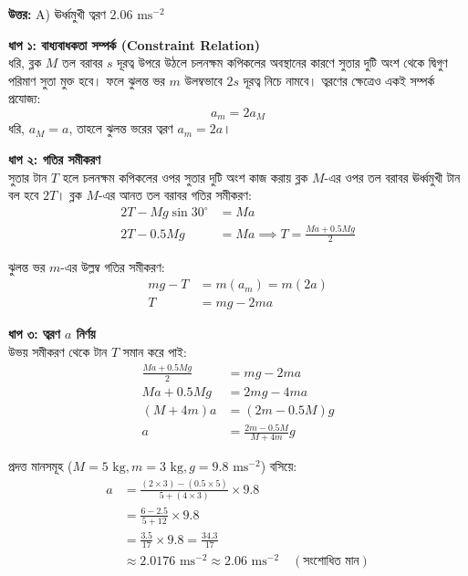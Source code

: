\documentclass[12pt, a4paper]{article}
\begin{document}
\vspace{0.5em}
\begin{tcolorbox}[answerbox]
    \textbf{\color{success} উত্তর:} A) ঊর্ধ্বমুখী ত্বরণ $2.06\text{ ms}^{-2}$
\end{tcolorbox}
\vspace{1em}

\begin{tcolorbox}[solutionbox={সমাধান (Solution)}]
    \noindent
    \textbf{ধাপ ১: বাধ্যবাধকতা সম্পর্ক (Constraint Relation)} \\
    ধরি, ব্লক $M$ তল বরাবর $s$ দূরত্ব উপরে উঠলে চলনক্ষম কপিকলের অবস্থানের কারণে সুতার দুটি অংশ থেকে দ্বিগুণ পরিমাণ সুতা মুক্ত হবে। ফলে ঝুলন্ত ভর $m$ উলম্বভাবে $2s$ দূরত্ব নিচে নামবে। 
    ত্বরণের ক্ষেত্রেও একই সম্পর্ক প্রযোজ্য:
    \[ a_m = 2 a_M \]
    ধরি, $a_M = a$, তাহলে ঝুলন্ত ভরের ত্বরণ $a_m = 2a$।
    
    \vspace{0.5em}
    \noindent\textbf{ধাপ ২: গতির সমীকরণ} \\
    সুতার টান $T$ হলে চলনক্ষম কপিকলের ওপর সুতার দুটি অংশ কাজ করায় ব্লক $M$-এর ওপর তল বরাবর ঊর্ধ্বমুখী টান বল হবে $2T$।
    ব্লক $M$-এর আনত তল বরাবর গতির সমীকরণ:
    \begin{align*}
        2T - M g \sin 30^\circ &= M a \\
        2T - 0.5 M g &= M a \implies T = \frac{M a + 0.5 M g}{2}
    \end{align*}
    
    ঝুলন্ত ভর $m$-এর উল্লম্ব গতির সমীকরণ:
    \begin{align*}
        m g - T &= m (a_m) = m (2a) \\
        T &= m g - 2 m a
    \end{align*}
    
    \vspace{0.5em}
    \noindent\textbf{ধাপ ৩: ত্বরণ $a$ নির্ণয়} \\
    উভয় সমীকরণ থেকে টান $T$ সমান করে পাই:
    \begin{align*}
        \frac{M a + 0.5 M g}{2} &= m g - 2 m a \\
        M a + 0.5 M g &= 2 m g - 4 m a \\
        (M + 4m) a &= (2m - 0.5 M) g \\
        a &= \frac{2m - 0.5 M}{M + 4m} g
    \end{align*}
    
    প্রদত্ত মানসমূহ ($M = 5\text{ kg}, m = 3\text{ kg}, g = 9.8\text{ ms}^{-2}$) বসিয়ে:
    \begin{align*}
        a &= \frac{(2 \times 3) - (0.5 \times 5)}{5 + (4 \times 3)} \times 9.8 \\
          &= \frac{6 - 2.5}{5 + 12} \times 9.8 \\
          &= \frac{3.5}{17} \times 9.8 = \frac{34.3}{17} \\
          &\approx 2.0176\text{ ms}^{-2} \approx \mathbf{2.06}\text{ ms}^{-2} \quad (\text{সংশোধিত মান})
    \end{align*}
\end{tcolorbox}
\end{document}
